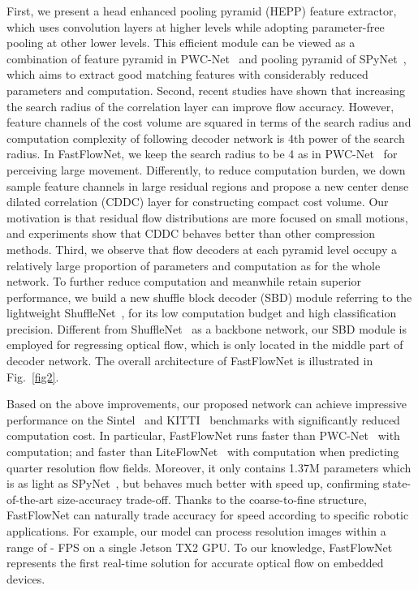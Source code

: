 \documentclass[letterpaper, 10 pt, conference]{ieeeconf}
\begin{document}
First, we present a head enhanced pooling pyramid (HEPP) feature extractor, which uses convolution layers at 
higher levels while adopting parameter-free pooling at 
other lower levels. This efficient module can be viewed 
as a combination of feature pyramid in PWC-Net~\cite{Sun_2018_CVPR} and pooling pyramid of SPyNet~\cite{Ranjan_2017}, which 
aims to extract good matching features  with  considerably 
reduced parameters and computation. Second, recent studies \cite{Sun_2018_CVPR, hofinger2019improving} have shown that increasing the  search radius of the correlation layer can improve flow accuracy. However, feature channels of the cost volume are squared in terms of the search radius and computation complexity of following decoder network is  4th power 
of the search radius. In FastFlowNet, we keep the search radius to be 4 as in  PWC-Net~\cite{Sun_2018_CVPR} for perceiving large movement. Differently, to reduce computation burden, we down sample feature channels in large residual regions and propose a new 
center dense dilated correlation (CDDC) layer for constructing compact cost volume. Our motivation is that residual flow distributions are more focused on small motions, and experiments show that CDDC behaves better than other compression methods. Third, we observe that flow decoders at 
each pyramid level occupy a relatively large proportion of parameters and computation as for the whole network. To further reduce computation and meanwhile retain 
superior performance, we build a new shuffle block decoder (SBD) module referring to the lightweight ShuffleNet~\cite{8578814}, for its low computation budget and high classification precision. Different from ShuffleNet~\cite{8578814} as a backbone network, our SBD module is employed for regressing optical flow, which 
is only located in the middle part of decoder network. The overall architecture of FastFlowNet is illustrated 
in Fig.~\ref{fig2}.




Based on the above improvements, our proposed network can achieve impressive 
performance on the Sintel~\cite{Butler_2012} and KITTI~\cite{7298925} benchmarks with significantly reduced computation cost. 
In particular, FastFlowNet runs  faster than PWC-Net~\cite{Sun_2018_CVPR} with  computation; and  faster than LiteFlowNet~\cite{Hui_2018_CVPR} with  computation  when predicting quarter resolution flow fields. Moreover, it only contains 1.37M parameters which is as light as SPyNet~\cite{Ranjan_2017}, but behaves much better with  speed up, confirming state-of-the-art size-accuracy trade-off. Thanks to the coarse-to-fine structure, FastFlowNet can naturally trade accuracy for speed according to specific robotic applications. For example, our model can process  resolution images within a range of - FPS on a single  Jetson TX2 GPU. To our knowledge, FastFlowNet represents the first real-time solution for accurate optical flow on embedded devices.
\end{document}

